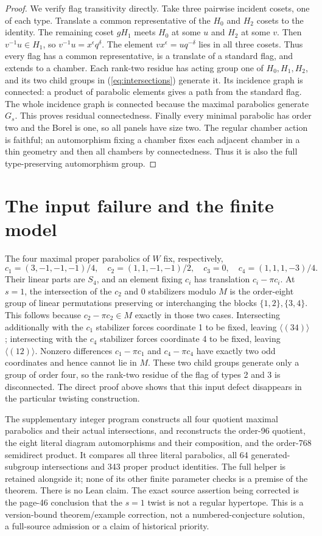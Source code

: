 \begin{proof}
We verify flag transitivity directly. Take three pairwise incident
cosets, one of each type. Translate a common representative of the
$H_0$ and $H_2$ cosets to the identity. The remaining coset $gH_1$
meets $H_0$ at some $u$ and $H_2$ at some $v$.
Then $v^{-1}u\in H_1$, so
$v^{-1}u=x^\epsilon q^\delta$. The element
$vx^\epsilon=uq^{-\delta}$ lies in all three cosets. Thus every
flag has a common representative, is a translate of a standard flag,
and extends to a chamber. Each rank-two residue has acting group one
of $H_0,H_1,H_2$, and its two child groups in
(\ref{eq:intersections}) generate it. Its incidence graph is connected:
a product of parabolic elements gives a path from the standard flag.
The whole incidence graph is connected because the maximal parabolics
generate $G_s$. This proves residual connectedness. Finally every
minimal parabolic has order two and the Borel is one, so all panels
have size two. The regular chamber action is faithful; an automorphism
fixing a chamber fixes each adjacent chamber in a thin geometry and
then all chambers by connectedness. Thus it is also the full
type-preserving automorphism group.
\end{proof}

\section{The input failure and the finite model}
The four maximal proper parabolics of $W$ fix, respectively,
\[
 c_1=(3,-1,-1,-1)/4,\quad c_2=(1,1,-1,-1)/2,
 \quad c_3=0,\quad c_4=(1,1,1,-3)/4.
\]
Their linear parts are $S_4$, and an element fixing $c_i$ has
translation $c_i-\pi c_i$. At $s=1$, the intersection of the
$c_2$ and $0$ stabilizers modulo $M$ is the order-eight group of
linear permutations preserving or interchanging the blocks
$\{1,2\},\{3,4\}$. This follows because $c_2-\pi c_2\in M$
exactly in those two cases. Intersecting additionally with the
$c_1$ stabilizer forces coordinate 1 to be fixed, leaving
$\langle(34)\rangle$; intersecting with the $c_4$ stabilizer
forces coordinate 4 to be fixed, leaving $\langle(12)\rangle$.
Nonzero differences $c_1-\pi c_1$ and $c_4-\pi c_4$ have exactly
two odd coordinates and hence cannot lie in $M$.
These two child groups generate only a group of order four, so the
rank-two residue of the flag of types 2 and 3 is disconnected.
The direct proof above shows that this input defect disappears in
the particular twisting construction.

The supplementary integer program constructs all four quotient maximal
parabolics and their actual intersections, and reconstructs the order-96 quotient,
the eight literal diagram automorphisms and their composition, and
the order-768 semidirect product. It compares all three literal
parabolics, all 64 generated-subgroup intersections and 343 proper
product identities. The full helper is retained alongside it; none
of its other finite parameter checks is a premise of the theorem.
There is no Lean claim. The exact source assertion being corrected
is the page-46 conclusion that the $s=1$ twist is not a regular
hypertope. This is a version-bound theorem/example correction, not a
numbered-conjecture solution, a full-source admission or a claim of
historical priority.

